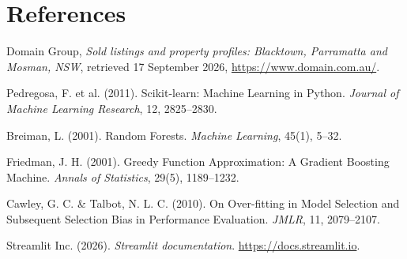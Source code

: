 \documentclass[12pt,a4paper]{article}
\begin{document}
\section{References}

\begin{enumerate}[label={[\arabic*]}, leftmargin=*]
    \item Domain Group, \emph{Sold listings and property profiles: Blacktown, Parramatta and
    Mosman, NSW}, retrieved 17 September 2026, \url{https://www.domain.com.au/}.
    \item Pedregosa, F. et al. (2011). Scikit-learn: Machine Learning in Python.
    \emph{Journal of Machine Learning Research}, 12, 2825--2830.
    \item Breiman, L. (2001). Random Forests. \emph{Machine Learning}, 45(1), 5--32.
    \item Friedman, J. H. (2001). Greedy Function Approximation: A Gradient Boosting Machine.
    \emph{Annals of Statistics}, 29(5), 1189--1232.
    \item Cawley, G. C. \& Talbot, N. L. C. (2010). On Over-fitting in Model Selection and
    Subsequent Selection Bias in Performance Evaluation. \emph{JMLR}, 11, 2079--2107.
    \item Streamlit Inc. (2026). \emph{Streamlit documentation}. \url{https://docs.streamlit.io}.
\end{enumerate}
\end{document}
